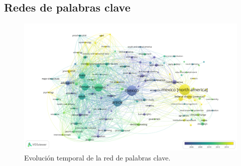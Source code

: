 

\subsection{Redes de palabras clave}

\begin{figure}[ht]
	\centering
	\includegraphics[width=\textwidth]{imagenes/net_kw_tiempo.png}
	\caption{Evolución temporal de la red de palabras clave.}
	\label{fig:ckw_tiempo}   
\end{figure}

